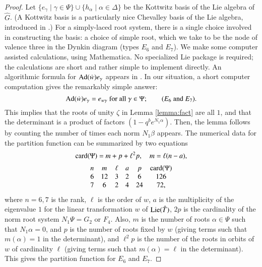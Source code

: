 \begin{proof}
  Let $\{ e_\gamma \mid \gamma\in \Psi\}\cup \{h_\alpha\mid
  \alpha\in\Delta\}$ be the Kottwitz basis of the Lie algebra of $\hat
  G$.  (A Kottwitz basis is a particularly nice Chevalley basis of the
  Lie algebra, introduced in \cite{cassstructure}.)  For a
  simply-laced root system, there is a single choice involved in
  constructing the basis: a choice of simple root, which we take to be
  the node of valence three in the Dynkin diagram (types $E_6$ and
  $E_7$).  We make some computer assisted calculations, using
  Mathematica.  No specialized Lie package is required; the
  calculations are short and rather simple to implement directly.  An
  algorithmic formula for ${\operatorname{Ad}}(\dot w) e_\gamma$ appears in
  \cite{cassstructure}.  In our situation, a short computer
  computation gives the remarkably simple answer:
\[
{\operatorname{Ad}}(\dot w) e_\gamma 
= e_{w\gamma}\text{ for all } \gamma\in \Psi;
\qquad (E_6 \text{ and } E_7).
\]
This implies that the roots of unity $\zeta$ in Lemma \ref{lemma:fact}
are all $1$, and that the determinant is a product of factors $(1-q^b
e^{N_1\alpha})$.  Then, the lemma follows by counting the number of
times each norm $N_1\beta$ appears.  The numerical data for the
partition function can be summarized by two equations
\begin{equation}\label{eqn:count}
{\operatorname{card}}(\Psi) = m + p + \ell^2 p,\quad m = \ell(n-a),
\end{equation}
\begin{align*}
\begin{matrix}
n & m&\ell & a & p & {\operatorname{card}}(\Psi)\\
6 & 12&3 & 2 & 6 & 126\\
7 & 6& 2 & 4 & 24 & 72,
\end{matrix}
\end{align*}
where $n=6,7$ is the rank, $\ell$ is the order of $w$, $a$ is the
multiplicity of the eigenvalue $1$ for the linear transformation $w$
of ${\operatorname{Lie}}(\hat T)$, $2p$ is the cardinality of the norm root system
$N_1\Psi = G_2$ or $F_4$.  Also, $m$ is the number of roots
$\alpha\in\Psi$ such that $N_1\alpha=0$, and $p$ is the number of
roots fixed by $w$ (giving terms such that $m(\alpha)=1$ in the
determinant), and $\ell^2p$ is the number of the roots in orbits of
$w$ of cardinality $\ell$ (giving terms such that $m(\alpha)=\ell$ in
the determinant).  This gives the partition function  for $E_6$ and $E_7$.


\end{proof}
